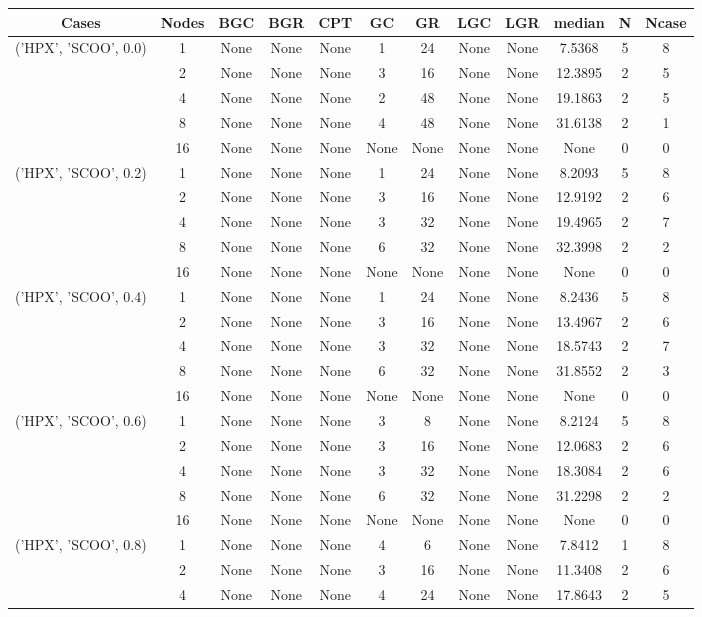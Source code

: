 \begin{tabular}{cccccccccccc}
\hline
Cases & Nodes& BGC& BGR& CPT& GC& GR& LGC& LGR& median & N & Ncase \\
\hline
\multirow{5}{*}{('HPX', 'SCOO', 0.0)}& 1& None& None& None& 1& 24& None& None& 7.5368& 5& 8\\
& 2& None& None& None& 3& 16& None& None& 12.3895& 2& 5\\
& 4& None& None& None& 2& 48& None& None& 19.1863& 2& 5\\
& 8& None& None& None& 4& 48& None& None& 31.6138& 2& 1\\
& 16& None& None& None& None& None& None& None& None& 0& 0\\
\hline
\multirow{5}{*}{('HPX', 'SCOO', 0.2)}& 1& None& None& None& 1& 24& None& None& 8.2093& 5& 8\\
& 2& None& None& None& 3& 16& None& None& 12.9192& 2& 6\\
& 4& None& None& None& 3& 32& None& None& 19.4965& 2& 7\\
& 8& None& None& None& 6& 32& None& None& 32.3998& 2& 2\\
& 16& None& None& None& None& None& None& None& None& 0& 0\\
\hline
\multirow{5}{*}{('HPX', 'SCOO', 0.4)}& 1& None& None& None& 1& 24& None& None& 8.2436& 5& 8\\
& 2& None& None& None& 3& 16& None& None& 13.4967& 2& 6\\
& 4& None& None& None& 3& 32& None& None& 18.5743& 2& 7\\
& 8& None& None& None& 6& 32& None& None& 31.8552& 2& 3\\
& 16& None& None& None& None& None& None& None& None& 0& 0\\
\hline
\multirow{5}{*}{('HPX', 'SCOO', 0.6)}& 1& None& None& None& 3& 8& None& None& 8.2124& 5& 8\\
& 2& None& None& None& 3& 16& None& None& 12.0683& 2& 6\\
& 4& None& None& None& 3& 32& None& None& 18.3084& 2& 6\\
& 8& None& None& None& 6& 32& None& None& 31.2298& 2& 2\\
& 16& None& None& None& None& None& None& None& None& 0& 0\\
\hline
\multirow{5}{*}{('HPX', 'SCOO', 0.8)}& 1& None& None& None& 4& 6& None& None& 7.8412& 1& 8\\
& 2& None& None& None& 3& 16& None& None& 11.3408& 2& 6\\
& 4& None& None& None& 4& 24& None& None& 17.8643& 2& 5\\

\end{tabular}
